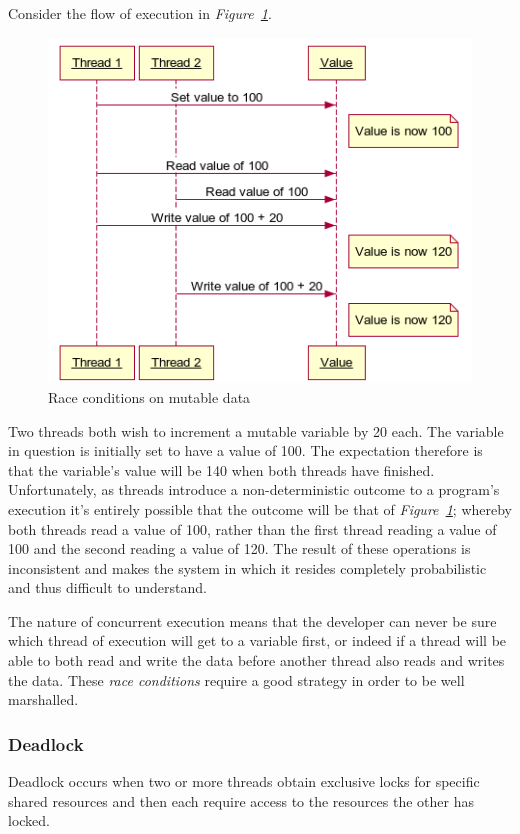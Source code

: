 \documentclass[12pt,a4paper]{article}
\begin{document}
Consider the flow of execution in \textit{Figure~\ref{fig:concurrentProblem}}.
\begin{figure}[h]
  \centering
  \includegraphics[scale=.65]{raceConditions1}
  \caption{Race conditions on mutable data}
  \label{fig:concurrentProblem}
\end{figure}
Two threads both wish to increment a mutable variable by 20 each. The variable in question is initially set to have a value of 100. The expectation therefore is that the variable's value will be 140 when both threads have finished. Unfortunately, as threads introduce a non-deterministic outcome to a program's execution it's entirely possible that the outcome will be that of \textit{Figure~\ref{fig:concurrentProblem}}; whereby both threads read a value of 100, rather than the first thread reading a value of 100 and the second reading a value of 120. The result of these operations is inconsistent and makes the system in which it resides completely probabilistic and thus difficult to understand.

The nature of concurrent execution means that the developer can never be sure which thread of execution will get to a variable first, or indeed if a thread will be able to both read and write the data before another thread also reads and writes the data. These \emph{race conditions} require a good strategy in order to be well marshalled.

\subsubsection{Deadlock}
Deadlock occurs when two or more threads obtain exclusive locks for specific shared resources and then each require access to the resources the other has locked. 
\end{document}
